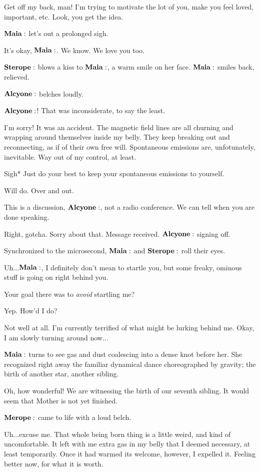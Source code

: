 \documentclass[main.tex]{subfiles}
\begin{document}
\Maia Get off my back, man!  I'm trying to motivate the lot of you, make you feel loved, important, etc.  Look, you get the idea. 

$\Maia$ let's out a prolonged sigh.

\Sterope It's okay, $\Maia$.  We know.  We love you too.

$\Sterope$ blows a kiss to $\Maia$, a warm smile on her face.  $\Maia$ smiles back, relieved.

$\Alcyone$ belches loudly.

\Sterope $\Alcyone$!  That was inconsiderate, to say the least.

\Alcyone I'm sorry!  It was an accident.  The magnetic field lines are all churning and wrapping around themselves inside my belly.  They keep breaking out and reconnecting, as if of their own free will.  Spontaneous emissions are, unfotunately, inevitable.  Way out of my control, at least.

\Maia *Sigh*  Just do your best to keep your spontaneous emissions to yourself.

\Alcyone Will do.  Over and out.

\Maia This is a discussion, $\Alcyone$, not a radio conference.  We can tell when you are done speaking.

\Alcyone Right, gotcha.  Sorry about that. Message received.  $\Alcyone$ signing off.

Synchronized to the microsecond, $\Maia$ and $\Sterope$ roll their eyes.

\Electra Uh...$\Maia$, I definitely don't mean to startle you, but some freaky, ominous stuff is going on right behind you.

\Maia Your goal there was to \textit{avoid} startling me?

\Electra Yep.  How'd I do?

\Maia Not well at all.  I'm currently terrified of what might be lurking behind me.  Okay, I am slowly turning around now...

$\Maia$ turns to see gas and dust coalescing into a dense knot before her.  She recognized right away the familiar dynamical dance choreographed by gravity; the birth of another star, another sibling.

\Maia Oh, how wonderful!  We are witnessing the birth of our seventh sibling.  It would seem that Mother is not yet finished.

$\Merope$ came to life with a loud belch.

\Merope Uh...excuse me.  That whole being born thing is a little weird, and kind of uncomfortable.  It left with me extra gas in my belly that I deemed necessary, at least temporarily.  Once it had warmed its welcome, however, I expelled it.  Feeling better now, for what it is worth.  
\end{document}
